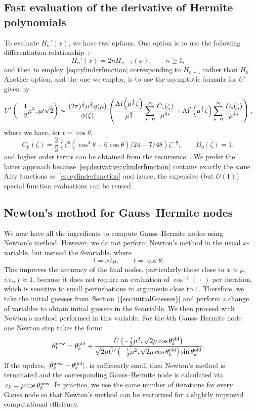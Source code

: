 \documentclass[final]{siamltex}
\begin{document}
\subsection{Fast evaluation of the derivative of Hermite polynomials}
To evaluate $H_n'(x)$, we have two options. One option is to use the following differentiation relationship~\cite[(18.9.25)]{NISTHandbook}:
\[
 H_n'(x) = 2n H_{n-1}(x), \qquad n\geq 1, 
\]
and then to employ~\eqref{eq:cylinderfunction} corresponding to $H_{n-1}$ rather than $H_n$. Another option, 
and the one we employ, is to use the asymptotic formula for $U'$ given by~\cite[(12.10.36)]{NISTHandbook}
\begin{equation}
U'\left(-\frac{1}{2}\mu^2,\mu t\sqrt{2}\right) \sim \frac{(2\pi)^{\frac{1}{2}} \mu^{\frac{2}{3}} g(\mu)}{\phi(\zeta)}\left(\frac{{\rm Ai}\left(\mu^{\frac{4}{3}}\zeta\right)}{\mu^{\frac{4}{3}}}\sum_{s=0}^\infty \frac{C_s(\zeta)}{\mu^{4s}} + {\rm Ai}'\left(\mu^{\frac{4}{3}}\zeta\right)\sum_{s=0}^\infty \frac{D_s(\zeta)}{\mu^{4s}}\right),
\label{eq:derivativecylinderfunction}
\end{equation}
where we have, for $t = \cos\theta$,
\[
 C_0(\zeta) = \frac{2}{3}\left(\zeta^6(\cos^3\theta + 6\cos\theta)/24 - 7/48\right)\zeta^{-\frac{2}{3}}, \qquad D_0(\zeta) = 1,
\]
and higher order terms can be obtained from the recurrence~\cite[(12.10.44)]{NISTHandbook}.  We prefer the latter approach 
because~\eqref{eq:derivativecylinderfunction} contains exactly the same Airy functions as~\eqref{eq:cylinderfunction} 
and hence, the expensive (but $\mathcal O(1)$) special function evaluations can be reused.  

\subsection{Newton's method for Gauss--Hermite nodes} 
We now have all the ingredients to compute Gauss--Hermite nodes using Newton's method. However, we do not perform 
Newton's method in the usual $x$-variable, but instead the $\theta$-variable, where 
\[
 t = x/\mu, \qquad t = \cos \theta. 
\]
This improves the accuracy of the final nodes, particularly those close to $x\approx \mu$, \emph{i.e.}, $t\approx 1$, because it does not require an evaluation of $\cos^{-1}(\,\cdot\,)$ per 
iteration, which is sensitive to small perturbations in arguments close to $1$. Therefore, we take the initial guesses from~{Section~\ref{{sec:initialGuesses}}} 
and perform a change of variables to obtain initial guesses in the $\theta$-variable. We then proceed with Newton's method performed in this variable. 
For the $k$th Gauss--Hermite node one Newton step takes the form: 
\[
 \theta_k^{\rm new} = \theta_k^{\rm old} + \frac{\tilde{U}\left(-\frac{1}{2}\mu^2,\sqrt{2}\mu \cos\theta_k^{\rm old} \right)}{\sqrt{2}\mu \tilde{U}'\left(-\frac{1}{2}\mu^2,\sqrt{2}\mu \cos\theta_k^{\rm old} \right)\sin\theta_k^{\rm old}}. 
\]
If the update, $|\theta_k^{\rm new} - \theta_k^{\rm old}|$, is sufficiently small then Newton's method is terminated and the corresponding 
Gauss--Hermite node is calculated via $x_k = \mu\cos\theta_k^{\rm new}$.    In practice, we use the 
same number of iterations for every Gauss node so that Newton's method can 
be vectorized for a slightly improved computational efficiency. 
\end{document}
